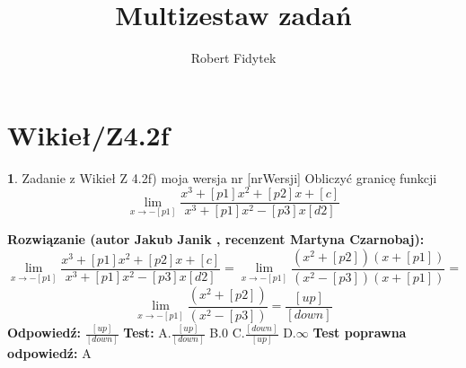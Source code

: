 \documentclass[12pt, a4paper]{article}
\title{Multizestaw zadań}
\author{Robert Fidytek}
\date{}
\theoremstyle{definition} %
\newtheorem{zad}{}
\newcommand{\kategoria}[1]{\section{#1}} %
\newcommand{\zadStart}[1]{\begin{zad}#1\newline} %
\newcommand{\zadStop}{\end{zad}}   %
\newcommand{\rozwStart}[2]{\noindent \textbf{Rozwiązanie (autor #1 , recenzent #2): }\newline} %
\newcommand{\rozwStop}{\newline}                                            %
\newcommand{\odpStart}{\noindent \textbf{Odpowiedź:}\newline}    %
\newcommand{\odpStop}{\newline}                                             %
\newcommand{\testStart}{\noindent \textbf{Test:}\newline} %
\newcommand{\testStop}{\newline} %
\newcommand{\kluczStart}{\noindent \textbf{Test poprawna odpowiedź:}\newline} %
\newcommand{\kluczStop}{\newline} %
\begin{document}
\maketitle


\kategoria{Wikieł/Z4.2f}
\zadStart{Zadanie z Wikieł Z 4.2f) moja wersja nr [nrWersji]}
Obliczyć granicę funkcji $$\lim_{x \to -[p1]} \frac{x^3 + [p1]x^2 + [p2]x + [c]}{x^3 + [p1]x^2 - [p3]x [d2]}$$
\zadStop
\rozwStart{Jakub Janik}{Martyna Czarnobaj}
$$\lim_{x \to -[p1]} \frac{x^3 + [p1]x^2 + [p2]x + [c]}{x^3 + [p1]x^2 - [p3]x [d2]}=\lim_{x \to -[p1]} \frac{(x^2+[p2])(x+[p1])}{(x^2-[p3])(x+[p1])}=$$
$$\lim_{x \to -[p1]} \frac{(x^2+[p2])}{(x^2-[p3])}=\frac{[up]}{[down]}$$
\rozwStop
\odpStart
$\frac{[up]}{[down]}$
\odpStop
\testStart
A.$\frac{[up]}{[down]}$
B.$0$
C.$\frac{[down]}{[up]}$
D.$\infty$
\testStop
\kluczStart
A
\kluczStop
\end{document}
